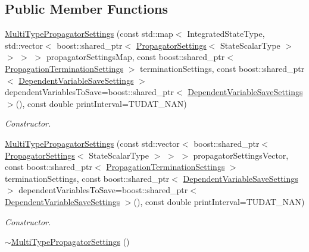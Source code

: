 \subsection*{Public Member Functions}
\begin{DoxyCompactItemize}
\item 
\hyperlink{classtudat_1_1propagators_1_1MultiTypePropagatorSettings_a69251cc9c5d8da9bf959bc2f8ac12e7b}{Multi\+Type\+Propagator\+Settings} (const std\+::map$<$ Integrated\+State\+Type, std\+::vector$<$ boost\+::shared\+\_\+ptr$<$ \hyperlink{classtudat_1_1propagators_1_1PropagatorSettings}{Propagator\+Settings}$<$ State\+Scalar\+Type $>$ $>$ $>$ $>$ propagator\+Settings\+Map, const boost\+::shared\+\_\+ptr$<$ \hyperlink{classtudat_1_1propagators_1_1PropagationTerminationSettings}{Propagation\+Termination\+Settings} $>$ termination\+Settings, const boost\+::shared\+\_\+ptr$<$ \hyperlink{classtudat_1_1propagators_1_1DependentVariableSaveSettings}{Dependent\+Variable\+Save\+Settings} $>$ dependent\+Variables\+To\+Save=boost\+::shared\+\_\+ptr$<$ \hyperlink{classtudat_1_1propagators_1_1DependentVariableSaveSettings}{Dependent\+Variable\+Save\+Settings} $>$(), const double print\+Interval=T\+U\+D\+A\+T\+\_\+\+N\+AN)
\begin{DoxyCompactList}\small\item\em Constructor. \end{DoxyCompactList}\item 
\hyperlink{classtudat_1_1propagators_1_1MultiTypePropagatorSettings_aa7643ab82e38a08ffa07431abb15b18b}{Multi\+Type\+Propagator\+Settings} (const std\+::vector$<$ boost\+::shared\+\_\+ptr$<$ \hyperlink{classtudat_1_1propagators_1_1PropagatorSettings}{Propagator\+Settings}$<$ State\+Scalar\+Type $>$ $>$ $>$ propagator\+Settings\+Vector, const boost\+::shared\+\_\+ptr$<$ \hyperlink{classtudat_1_1propagators_1_1PropagationTerminationSettings}{Propagation\+Termination\+Settings} $>$ termination\+Settings, const boost\+::shared\+\_\+ptr$<$ \hyperlink{classtudat_1_1propagators_1_1DependentVariableSaveSettings}{Dependent\+Variable\+Save\+Settings} $>$ dependent\+Variables\+To\+Save=boost\+::shared\+\_\+ptr$<$ \hyperlink{classtudat_1_1propagators_1_1DependentVariableSaveSettings}{Dependent\+Variable\+Save\+Settings} $>$(), const double print\+Interval=T\+U\+D\+A\+T\+\_\+\+N\+AN)
\begin{DoxyCompactList}\small\item\em Constructor. \end{DoxyCompactList}\item 
\hyperlink{classtudat_1_1propagators_1_1MultiTypePropagatorSettings_afb771c69041db1c20cd0d2667284cf74}{$\sim$\+Multi\+Type\+Propagator\+Settings} ()\hypertarget{classtudat_1_1propagators_1_1MultiTypePropagatorSettings_afb771c69041db1c20cd0d2667284cf74}{}\label{classtudat_1_1propagators_1_1MultiTypePropagatorSettings_afb771c69041db1c20cd0d2667284cf74}


\end{DoxyCompactItemize}
